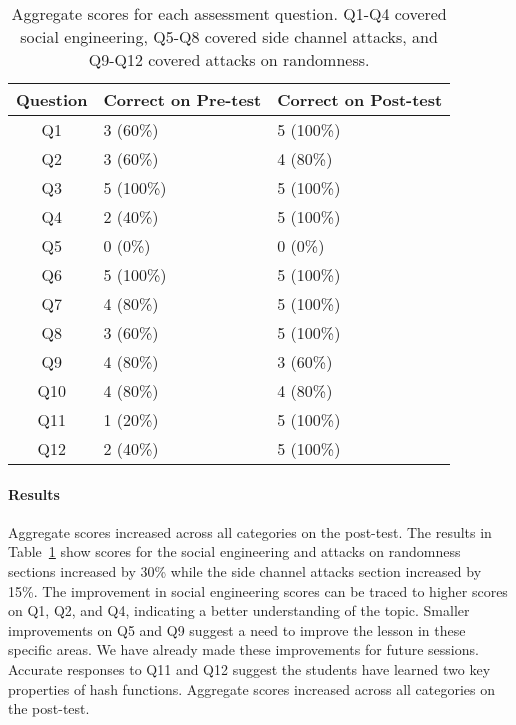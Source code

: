 \begin{table}
  \centering
  \scriptsize
  \begin{tabular}{c | l | l}
Question &  Correct on Pre-test   & Correct on Post-test \\
\hline
Q1   & 3 (60\%)  & 5 (100\%) \\
Q2   & 3 (60\%)  & 4 (80\%)  \\
Q3   & 5 (100\%) & 5 (100\%) \\
Q4   & 2 (40\%)  & 5 (100\%) \\
\hline
Q5   & 0 (0\%)   & 0 (0\%)   \\
Q6   & 5 (100\%) & 5 (100\%) \\
Q7   & 4 (80\%)  & 5 (100\%) \\
Q8   & 3 (60\%)  & 5 (100\%) \\
\hline
Q9   & 4 (80\%)  & 3 (60\%)  \\
Q10  & 4 (80\%)  & 4 (80\%)  \\
Q11  & 1 (20\%)  & 5 (100\%) \\
Q12  & 2 (40\%)  & 5 (100\%) \\
\end{tabular}

\caption{Aggregate scores for each assessment question. Q1-Q4 covered
  social engineering, Q5-Q8 covered side channel attacks, and Q9-Q12
  covered attacks on randomness.}
\label{fig:results}
\end{table}

\paragraph{Results}
Aggregate scores increased across all categories on the post-test.
The results in Table~\ref{fig:results} show scores for the social engineering and attacks on randomness sections
increased by 30\% while the side channel attacks section increased by
15\%.
The improvement in social engineering scores can be traced to
higher scores on
Q1, Q2, and Q4,
indicating a better understanding of the topic.
Smaller improvements on Q5 and Q9 suggest a need to improve the lesson in
these specific areas.  We have already made these improvements for future
sessions.
Accurate responses to Q11 and Q12
suggest the students have learned two
key properties of hash functions.
Aggregate scores increased across all categories on the post-test.


